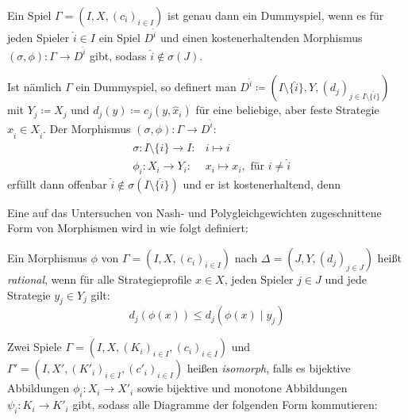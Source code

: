 \begin{bsp}
	Ein Spiel $\Gamma = (I, X, (c_i)_{i \in I})$ ist genau dann ein Dummyspiel, wenn es für jeden Spieler $\hat{i} \in I$ ein Spiel $D^{\hat{i}}$ und einen kostenerhaltenden Morphismus $(\sigma, \phi): \Gamma \to D^{\hat{i}}$ gibt, sodass $\hat{i} \notin \sigma(J)$.
	
	Ist nämlich $\Gamma$ ein Dummyspiel, so definert man $D^{\hat{i}} \coloneqq (I\setminus\{\hat{i}\}, Y, (d_j)_{j \in I\setminus\{\hat{i}\}})$ mit $Y_j \coloneqq X_j$ und $d_j(y) \coloneqq c_j(y, \hat{x}_i)$ für eine beliebige, aber feste Strategie $\hat{x}_{\hat{i}} \in X_{\hat{i}}$. Der Morphismus $(\sigma, \phi): \Gamma \to D^{\hat{i}}$:
	\begin{align*}
	&\sigma:	I\setminus\{\hat{i}\}	\to	 I:			&i		\mapsto	i  \\
	&\phi_i:	X_i						\to	 Y_i:		&x_i	\mapsto	x_i, \text{ für } i \neq \hat{i}
	\end{align*}
	erfüllt dann offenbar $\hat{i} \notin \sigma(I\setminus\{\hat{i}\})$ und er ist kostenerhaltend, denn
	
\end{bsp}

Eine auf das Untersuchen von Nash- und Polygleichgewichten zugeschnittene Form von Morphismen wird in \cite{Polyequilibrium} wie folgt definiert:

\begin{defn}
	Ein Morphismus $\phi$ von $\Gamma = (I, X, (c_i)_{i\in I})$ nach $\Delta = (J, Y, (d_j)_{j\in J})$ heißt \emph{rational}, wenn für alle Strategieprofile $x \in X$, jeden Spieler $j \in J$ und jede Strategie $y_j \in Y_j$ gilt:
	\[d_j(\phi(x)) \leq d_j(\phi(x) \mid y_j) \]
\end{defn}




\begin{defn}\label{def:SpielIsomLap}
	Zwei Spiele $\Gamma = (I, X, (K_i)_{i\in I}, (c_i)_{i\in I})$ und $\Gamma' = (I, X', (K'_i)_{i\in I}, (c'_i)_{i\in I})$ heißen \emph{isomorph}, falls es bijektive Abbildungen $\phi_i: X_i \to X'_i$ sowie bijektive und monotone Abbildungen $\psi_i: K_i \to K'_i$ gibt, sodass alle Diagramme der folgenden Form kommutieren:
	
	\begin{center}
	\end{center}
\end{defn}

